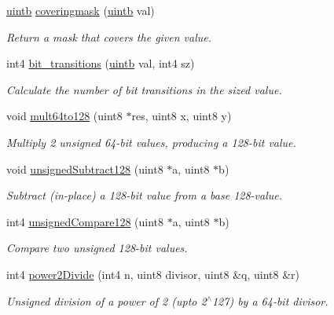 \begin{DoxyCompactItemize}
\mbox{\hyperlink{types_8h_a2db313c5d32a12b01d26ac9b3bca178f}{uintb}} \mbox{\hyperlink{address_8hh_a2564fa4bd27c56892b3673fb40281abe}{coveringmask}} (\mbox{\hyperlink{types_8h_a2db313c5d32a12b01d26ac9b3bca178f}{uintb}} val)
\begin{DoxyCompactList}\small\item\em Return a mask that {\itshape covers} the given value. \end{DoxyCompactList}\item 
int4 \mbox{\hyperlink{address_8hh_a9971349a0c8643a0f9d1211f2e6aa3c0}{bit\+\_\+transitions}} (\mbox{\hyperlink{types_8h_a2db313c5d32a12b01d26ac9b3bca178f}{uintb}} val, int4 sz)
\begin{DoxyCompactList}\small\item\em Calculate the number of bit transitions in the sized value. \end{DoxyCompactList}\item 
void \mbox{\hyperlink{address_8hh_adc3ee931652193c7dc50b842c3b4a3a6}{mult64to128}} (uint8 $\ast$res, uint8 x, uint8 y)
\begin{DoxyCompactList}\small\item\em Multiply 2 unsigned 64-\/bit values, producing a 128-\/bit value. \end{DoxyCompactList}\item 
void \mbox{\hyperlink{address_8hh_a5cf8e9c3bc7603d16ba085596b113002}{unsigned\+Subtract128}} (uint8 $\ast$a, uint8 $\ast$b)
\begin{DoxyCompactList}\small\item\em Subtract (in-\/place) a 128-\/bit value from a base 128-\/value. \end{DoxyCompactList}\item 
int4 \mbox{\hyperlink{address_8hh_ad5b0ee7c5f0453d92bd8ca35876f2728}{unsigned\+Compare128}} (uint8 $\ast$a, uint8 $\ast$b)
\begin{DoxyCompactList}\small\item\em Compare two unsigned 128-\/bit values. \end{DoxyCompactList}\item 
int4 \mbox{\hyperlink{address_8hh_a09cc44c82138abf1b8fce558a3f0878d}{power2\+Divide}} (int4 n, uint8 divisor, uint8 \&q, uint8 \&r)
\begin{DoxyCompactList}\small\item\em Unsigned division of a power of 2 (upto 2$^\wedge$127) by a 64-\/bit divisor. \end{DoxyCompactList}\end{DoxyCompactItemize}
